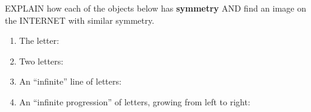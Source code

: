 \documentclass[noauthor,nooutcomes,12pt]{ximera}
\begin{document}
\begin{question}
  EXPLAIN how each of the objects below has \textbf{symmetry} AND find
  an image on the INTERNET with similar symmetry.
  \begin{enumerate}
  \item The letter:
    \begin{center}
    \end{center}
  \item Two letters:
    \begin{center}
    \end{center}
  \item An ``infinite'' line of letters:
    \begin{center}
    \end{center}
  \item An ``infinite progression'' of letters, growing from left to
    right:
    \begin{center}
    \end{center}
  \end{enumerate}


\end{question}
\end{document}
